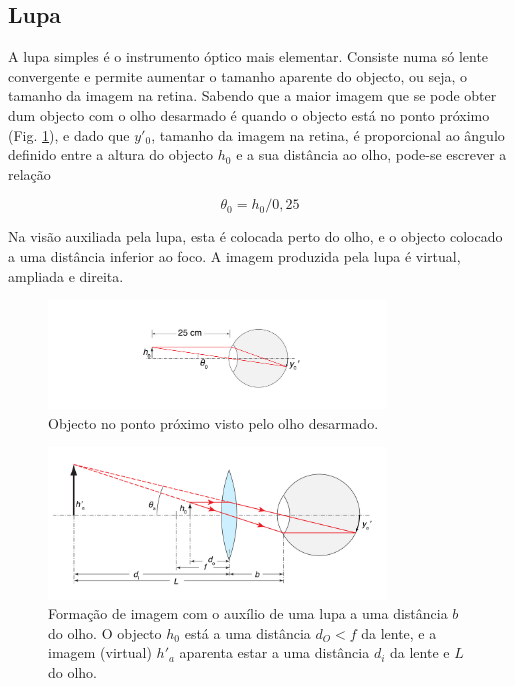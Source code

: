 \documentclass[a4paper,twoside,11pt]{report}      %
\begin{document}
\subsection{\sf Lupa}

A lupa simples é o instrumento óptico mais elementar. Consiste numa só lente convergente e permite aumentar o tamanho aparente do objecto, ou seja, o tamanho da imagem na retina. Sabendo que a maior imagem que se pode obter dum objecto com o olho desarmado é quando o objecto está no ponto próximo (Fig. \ref{fig:olho-4}), e dado que $y'_0$, tamanho da imagem na retina, é proporcional ao ângulo definido entre a altura do objecto $h_0$ e a sua distância ao olho, pode-se escrever a relação

\begin{equation}
\theta_0=h_0/0,25
\end{equation}

Na visão auxiliada pela lupa, esta é colocada perto do olho, e o objecto colocado a uma distância inferior ao foco. A imagem produzida pela lupa é virtual, ampliada e direita.

\begin{figure}
	[!tb]  \centering 
	\includegraphics[width=0.8\textwidth]{olho-4}
		\caption{Objecto no ponto próximo visto pelo olho desarmado. \label{fig:olho-4}} 
\end{figure}



\begin{figure}
	[!b]  \centering 
	\includegraphics[width=0.8\textwidth]{olho-5}
	\caption{Formação de imagem com o auxílio de uma lupa a uma distância $b$ do olho. O objecto $h_0$ está a uma distância $d_O<f$ da lente, e a imagem (virtual) $h'_a$ aparenta estar a uma distância $d_i$ da lente e $L$ do olho. \label{fig:olho-5}} 
\end{figure}
\end{document}
